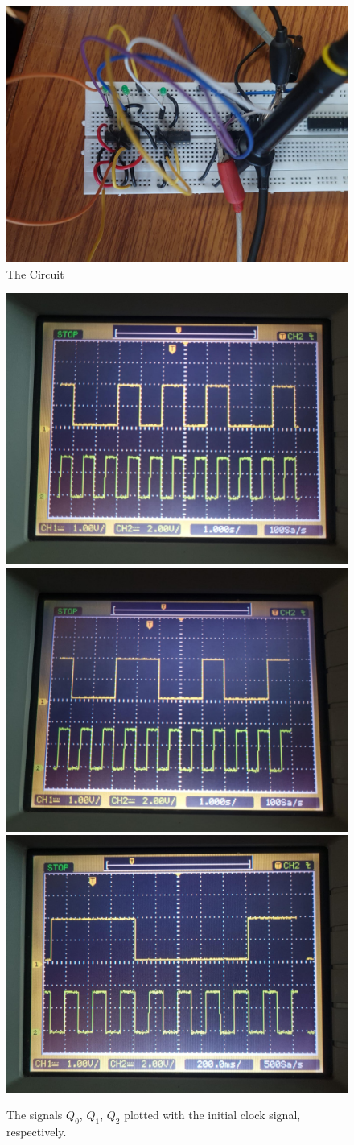 \documentclass[a4paper,12pt]{article}
\begin{document}
\begin{figure}[H]
    \centering
    \includegraphics[width = 0.6\columnwidth]{figs/full.jpeg}
    \caption{The Circuit}
\end{figure}
\begin{figure}[H]
    \centering
    \includegraphics[width = 0.6\columnwidth]{figs/q1.jpeg}
    \includegraphics[width = 0.6\columnwidth]{figs/q2.jpeg}
    \includegraphics[width = 0.6\columnwidth]{figs/q3.jpeg}
    \caption{The signals $Q_0$, $Q_1$, $Q_2$ plotted with the initial clock signal, respectively.}
\end{figure}
\end{document}
